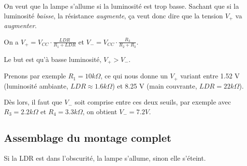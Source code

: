 \documentclass{../../template/labo}
\begin{document}
{
	On veut que la lampe s'allume si la luminosité est trop basse.
	Sachant que si la luminosité \textit{baisse}, la résistance \textit{augmente}, ça veut donc dire que la tension $V_+$ va \textit{augmenter}.

	On a $V_+ = V_{CC} \cdot \frac{LDR}{R_1 + LDR}$ et $V_- = V_{CC} \cdot \frac{R_3}{R_2+R_3}$.

	Le but est qu'à basse luminosité, $V_+ > V_-$.

	Prenons par exemple $R_1 = 10k\Omega$, ce qui nous donne un $V_+$ variant entre 1.52 V (luminosité ambiante, $LDR \approx 1.6k\Omega$) et 8.25 V (main couvrante, $LDR = 22k\Omega$).

	Dès lors, il faut que $V_-$ soit comprise entre ces deux seuils, par exemple avec $R_3 = 2.2k\Omega$ et $R_4 = 3.3 k\Omega$, on obtient $V_- = 7.2 V$.
}









\subsection{Assemblage du montage complet}

{
	Si la LDR est dans l'obscurité, la lampe s'allume, sinon elle s'éteint.
}

{

}




\end{document}
